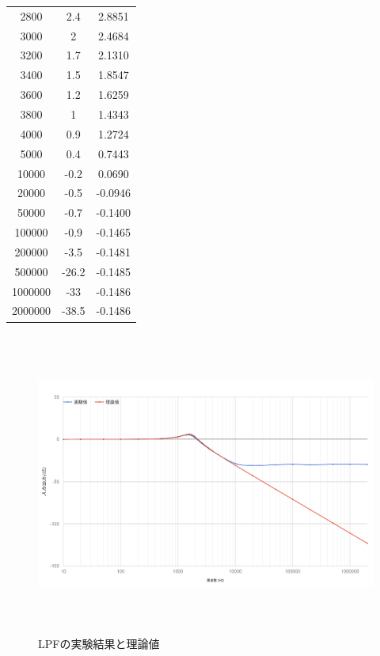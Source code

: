 \documentclass[11pt,a4j]{jsarticle}
\makeatletter
\newcommand{\figcaption}[1]{\def\@captype{figure}\caption{#1}}
\makeatother
\begin{document}
\begin{table}[H]
\begin{center}
\begin{tabular}{|c|c|c|}
        2800	&	2.4	&	2.8851	\\
        3000	&	2	&	2.4684	\\
        3200	&	1.7	&	2.1310	\\
        3400	&	1.5	&	1.8547	\\
        3600	&	1.2	&	1.6259	\\
        3800	&	1	&	1.4343	\\
        4000	&	0.9	&	1.2724	\\
        5000	&	0.4	&	0.7443	\\
        10000	&	-0.2	&	0.0690	\\
        20000	&	-0.5	&	-0.0946	\\
        50000	&	-0.7	&	-0.1400	\\
        100000	&	-0.9	&	-0.1465	\\
        200000	&	-3.5	&	-0.1481	\\
        500000	&	-26.2	&	-0.1485	\\
        1000000	&	-33	&	-0.1486	\\
        2000000	&	-38.5	&	-0.1486	\\ \hline
      \end{tabular}
  \end{center}
\end{table}


\begin{figure}[H]
  \centering
  \includegraphics[height=100mm,bb=0 0 1188 735]{image/LPF.png}
  \figcaption{LPFの実験結果と理論値}
  \label{fig:lpf}
\end{figure}
\end{document}
